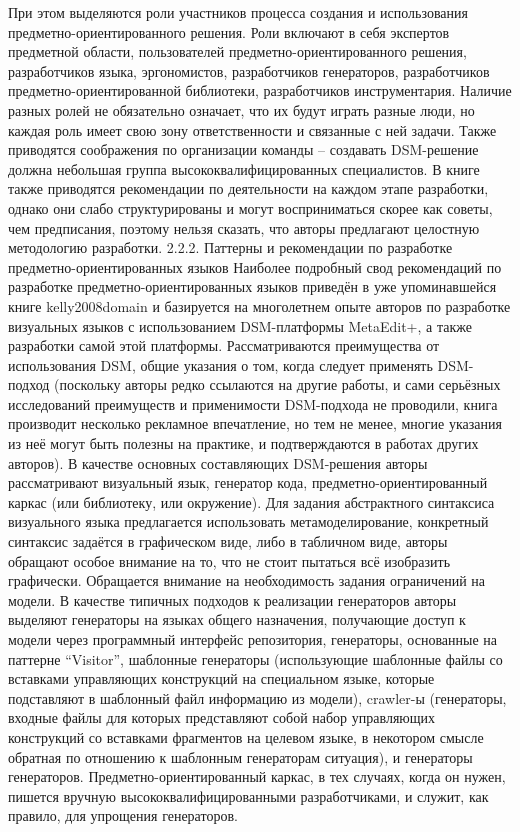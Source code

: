 	При этом выделяются роли участников процесса создания и использования предметно-ориентированного решения. Роли включают в себя экспертов предметной области, пользователей предметно-ориентированного решения, разработчиков языка, эргономистов, разработчиков генераторов, разработчиков предметно-ориентированной библиотеки, разработчиков инструментария. Наличие разных ролей не обязательно означает, что их будут играть разные люди, но каждая роль имеет свою зону ответственности и связанные с ней задачи. Также приводятся соображения по организации команды – создавать DSM-решение должна небольшая группа высококвалифицированных специалистов.
	В книге также приводятся рекомендации по деятельности на каждом этапе разработки, однако они слабо структурированы и могут восприниматься скорее как советы, чем предписания, поэтому нельзя сказать, что авторы предлагают целостную методологию разработки.
2.2.2. Паттерны и рекомендации по разработке предметно-ориентированных языков
	Наиболее подробный свод рекомендаций по разработке предметно-ориентированных языков приведён в уже упоминавшейся книге kelly2008domain и базируется на многолетнем опыте авторов по разработке визуальных языков с использованием DSM-платформы MetaEdit+, а также разработки самой этой платформы. Рассматриваются преимущества от использования DSM, общие указания о том, когда следует применять DSM-подход (поскольку авторы редко ссылаются на другие работы, и сами серьёзных исследований преимуществ и применимости DSM-подхода не проводили, книга производит несколько рекламное впечатление, но тем не менее, многие указания из неё могут быть полезны на практике, и подтверждаются в работах других авторов). В качестве основных составляющих DSM-решения авторы рассматривают визуальный язык, генератор кода, предметно-ориентированный каркас (или библиотеку, или окружение). Для задания абстрактного синтаксиса визуального языка предлагается использовать метамоделирование, конкретный синтаксис задаётся в графическом виде, либо в табличном виде, авторы обращают особое внимание на то, что не стоит пытаться всё изобразить графически. Обращается внимание на необходимость задания ограничений на модели. В качестве типичных подходов к реализации генераторов авторы выделяют генераторы на языках общего назначения, получающие доступ к модели через программный интерфейс репозитория, генераторы, основанные на паттерне “Visitor”, шаблонные генераторы (использующие шаблонные файлы со вставками управляющих конструкций на специальном языке, которые подставляют в шаблонный файл информацию из модели), crawler-ы (генераторы, входные файлы для которых представляют собой набор управляющих конструкций со вставками фрагментов на целевом языке, в некотором смысле обратная по отношению к шаблонным генераторам ситуация), и генераторы генераторов. Предметно-ориентированный каркас, в тех случаях, когда он нужен, пишется вручную высококвалифицированными разработчиками, и служит, как правило, для упрощения генераторов.
